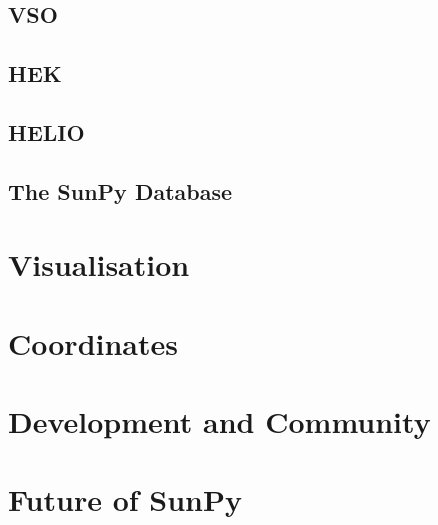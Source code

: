\documentclass[12pt]{iopart}
\begin{document}
	\subsection{VSO}
	
	\subsection{HEK}
	
	\subsection{HELIO}
	
	\subsection{The SunPy Database}

\section{Visualisation}

\section{Coordinates}

\section{Development and Community}

\section{Future of SunPy}

{}
\end{document}

